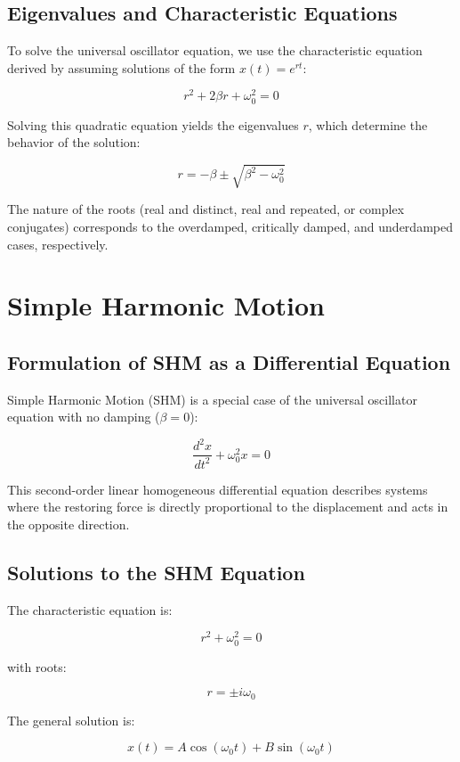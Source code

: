 \documentclass[12pt,a4paper]{article}
\begin{document}
\subsection{Eigenvalues and Characteristic Equations}

To solve the universal oscillator equation, we use the characteristic equation derived by assuming solutions of the form \( x(t) = e^{r t} \):

\[
r^2 + 2\beta r + \omega_0^2 = 0
\]

Solving this quadratic equation yields the eigenvalues \( r \), which determine the behavior of the solution:

\[
r = -\beta \pm \sqrt{\beta^2 - \omega_0^2}
\]

The nature of the roots (real and distinct, real and repeated, or complex conjugates) corresponds to the overdamped, critically damped, and underdamped cases, respectively.

\section{Simple Harmonic Motion}

\subsection{Formulation of SHM as a Differential Equation}

Simple Harmonic Motion (SHM) is a special case of the universal oscillator equation with no damping (\( \beta = 0 \)):

\[
\frac{d^2 x}{dt^2} + \omega_0^2 x = 0
\]

This second-order linear homogeneous differential equation describes systems where the restoring force is directly proportional to the displacement and acts in the opposite direction.

\subsection{Solutions to the SHM Equation}

The characteristic equation is:

\[
r^2 + \omega_0^2 = 0
\]

with roots:

\[
r = \pm i\omega_0
\]

The general solution is:

\[
x(t) = A \cos(\omega_0 t) + B \sin(\omega_0 t)
\]
\end{document}
